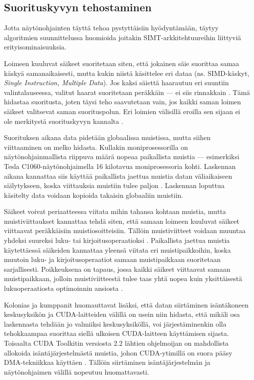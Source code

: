 \documentclass[a4paper,11pt]{article}
\newcommand{\engl}[1]{\foreignlanguage{english}{\em #1}}
\begin{document}
\subsection{Suorituskyvyn tehostaminen}

Jotta näytönohjainten täyttä tehoa pystyttäisiin hyödyntämään, täytyy algoritmien suunnittelussa huomioida joitakin SIMT-arkkitehtuureihin liittyviä erityisominaisuuksia.

Loimeen kuuluvat säikeet suoritetaan siten, että jokainen säie suorittaa samaa käskyä samanaikaisesti, mutta kukin niistä käsittelee eri dataa (ns. SIMD-käskyt, \engl{Single Instruction, Multiple Data}). Jos kaksi säiettä haarautuu eri suuntiin valintalauseessa, valitut haarat suoritetaan peräkkäin --- ei siis rinnakkain \cite{leischner2010}. Tämä hidastaa suoritusta, joten täysi teho saavutetaan vain, jos kaikki saman loimen säikeet valitsevat saman suorituspolun. Eri loimien välisillä eroilla sen sijaan ei ole merkitystä suorituskyvyn kannalta \cite{satish2009}.

Suorituksen aikana data pidetään globaalissa muistissa, mutta siihen viittaaminen on melko hidasta. Kullakin moniprosessorilla on näytönohjainmallista riippuva määrä nopeaa paikallista muistia --- esimerkiksi Tesla C1060-näytönohjaimella 16 kilotavua moniprosessoria kohti. Laskennan aikana kannattaa siis käyttää paikallista jaettua muistia datan väliaikaiseen säilytykseen, koska viittauksia muistiin tulee paljon \cite{leischner2010}. Laskennan loputtua käsitelty data voidaan kopioida takaisin globaaliin muistiin.

Säikeet voivat periaatteessa viitata mihin tahansa kohtaan muistia, mutta muistiviittaukset kannattaa tehdä siten, että samaan loimeen kuuluvat säikeet viittaavat peräkkäisiin muistiosoitteisiin. Tällöin muistiviitteet voidaan muuntaa yhdeksi suureksi luku- tai kirjoitusoperaatioksi \cite{satish2009}. Paikallista jaettua muistia käytettäessä säikeiden kannattaa yleensä viitata eri muistipaikkoihin, koska muutoin luku- ja kirjoitusoperaatiot samaan muistipaikkaan suoritetaan sarjallisesti. Poikkeuksena on tapaus, jossa kaikki säikeet viittaavat samaan muistipaikkaan, jolloin muistiviitteestä tulee taas yhtä nopea kuin yksittäisestä lukuoperaatiosta optimoinnin ansiosta \cite{cederman2009}.

Kolonias ja kumppanit \cite{kolonias2011} huomauttavat lisäksi, että datan siirtäminen isäntäkoneen keskusyksikön ja CUDA-laitteiden välillä on usein niin hidasta, että mikäli osa laskennasta tehdään jo valmiiksi keskusyksiköllä, voi järjestäminenkin olla tehokkaampaa suorittaa siellä ulkoisen CUDA-laitteen käyttämisen sijasta. Toisaalta CUDA Toolkitin versiosta 2.2 lähtien ohjelmoijan on mahdollista allokoida isäntäjärjestelmästä muistia, johon CUDA-ytimillä on suora pääsy DMA-tekniikkaa käyttäen \cite{kolonias2011}. Tällöin siirtäminen isäntäjärjestelmän ja näytönohjaimen välillä nopeutuu huomattavasti.
\end{document}
